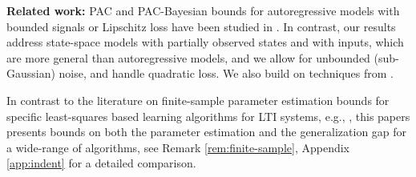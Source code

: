 \documentclass{article}
\begin{document}
    \textbf{Related work:}
    PAC and PAC-Bayesian bounds for autoregressive models with bounded signals or Lipschitz loss have been studied in \cite{campi2002finite,vidyasagar2006learning,alquier2012pred,alquier2013prediction,MASSUCCI2022110532,METAKALARD2026100373}. 
    In contrast, our results address state-space models with partially observed states and  with inputs, which are more general than autoregressive models, and we  allow for unbounded (sub-Gaussian) noise, and handle quadratic loss. We also build on techniques from \cite{alquier2012pred,alquier2013prediction}. 
\par
In contrast to the literature on finite-sample parameter estimation bounds for specific least-squares based learning
algorithms for LTI systems, e.g., \cite{simchowitz2019learning,simchowitz2021statistical,oymak2021revisiting,lale2020logarithmic,foster2020learning,NEURIPS2018_d6288499,Ziemann1,Ziemann2,SarkarRD21}, this papers presents bounds on both the parameter estimation and the generalization gap for a wide-range of algorithms, see Remark \ref{rem:finite-sample}, Appendix \ref{app:indent} for a detailed comparison.
\end{document}
